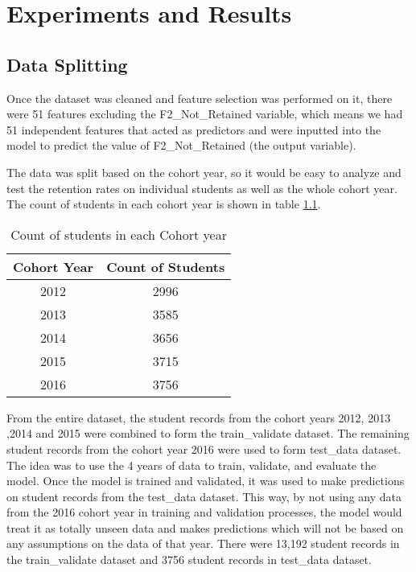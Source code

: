 \documentclass[11pt,openright]{report}
\begin{document}
\chapter{Experiments and Results} \label{chapter:building_models}

\section {Data Splitting }

Once the dataset was cleaned and feature selection was performed on it, there were 51 features excluding the F2\_Not\_Retained variable, which means we had 51 independent features that acted as predictors and were inputted into the model to predict the value of F2\_Not\_Retained (the output variable). 

The data was split based on the cohort year, so it would be easy to analyze and test the retention rates on individual students as well as the whole cohort year. The count of students in each cohort year is shown in table \ref{table:acad_db}.

\begin{table}[!htbp]
	\renewcommand{\arraystretch}{1.3}
	\caption{Count of students in each Cohort year}
	\label{table:acad_db}
	\centering
	\begin{tabular}{|c|c|}
    \hline
    \bfseries Cohort Year & \bfseries Count of Students \\ 
    \hline
  	2012 &  2996 \\ \hline
	2013 & 3585 \\ \hline
	2014 & 3656 \\ \hline
	2015 & 3715 \\ \hline
	2016 & 3756 \\ \hline
\end{tabular} 
\end{table}

From the entire dataset, the student records from the cohort years 2012, 2013 ,2014 and 2015 were combined to form the train\_validate dataset. The remaining student records from the cohort year 2016 were used to form test\_data dataset. The idea was to use the 4 years of data to train, validate, and evaluate the model. Once the model is trained and validated, it was used to make predictions on student records from the test\_data dataset. This way, by not using any data from the 2016 cohort year in training and validation processes, the model would treat it as totally unseen data and makes predictions which will not be based on any assumptions on the data of that year. There were 13,192 student records in the train\_validate dataset and 3756 student records in test\_data dataset.
\end{document}
